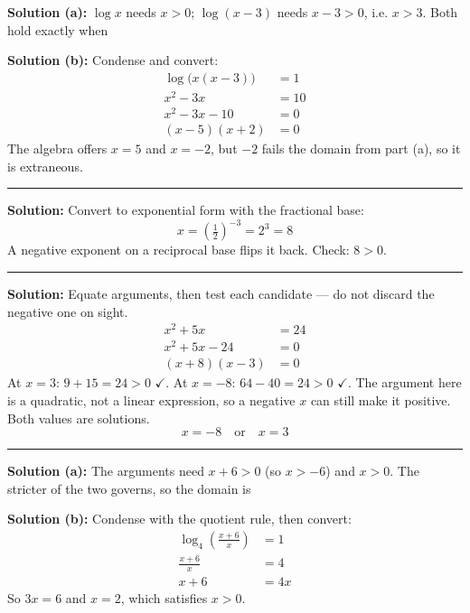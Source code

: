 \documentclass[12pt]{article}
\begin{document}
\textbf{Solution (a):} $\log x$ needs $x > 0$; $\log(x - 3)$ needs $x - 3 > 0$, i.e. $x > 3$. Both hold exactly when 

\textbf{Solution (b):} Condense and convert:
\begin{align*}
  \log\bigl(x(x - 3)\bigr) &= 1 \\
  x^{2} - 3x &= 10 \\
  x^{2} - 3x - 10 &= 0 \\
  (x - 5)(x + 2) &= 0
\end{align*}
The algebra offers $x = 5$ and $x = -2$, but $-2$ fails the domain from part (a), so it is extraneous. 

\vspace{0.1cm}\noindent\rule{\linewidth}{0.2pt}


\textbf{Solution:} Convert to exponential form with the fractional base:
\[ x = \left(\tfrac{1}{2}\right)^{-3} = 2^{3} = 8 \]
A negative exponent on a reciprocal base flips it back. Check: $8 > 0$. 

\vspace{0.1cm}\noindent\rule{\linewidth}{0.2pt}


\textbf{Solution:} Equate arguments, then test each candidate --- do not discard the negative one on sight.
\begin{align*}
  x^{2} + 5x &= 24 \\
  x^{2} + 5x - 24 &= 0 \\
  (x + 8)(x - 3) &= 0
\end{align*}
At $x = 3$: $9 + 15 = 24 > 0$ $\checkmark$. \quad At $x = -8$: $64 - 40 = 24 > 0$ $\checkmark$.
The argument here is a quadratic, not a linear expression, so a negative $x$ can still make it positive. Both values are solutions.
\[ \boxed{x = -8 \quad \text{or} \quad x = 3} \]

\vspace{0.1cm}\noindent\rule{\linewidth}{0.2pt}


\textbf{Solution (a):} The arguments need $x + 6 > 0$ (so $x > -6$) and $x > 0$. The stricter of the two governs, so the domain is 

\textbf{Solution (b):} Condense with the quotient rule, then convert:
\begin{align*}
  \log_{4}\!\left(\frac{x + 6}{x}\right) &= 1 \\
  \frac{x + 6}{x} &= 4 \\
  x + 6 &= 4x
\end{align*}
So $3x = 6$ and $x = 2$, which satisfies $x > 0$. 
\end{document}

